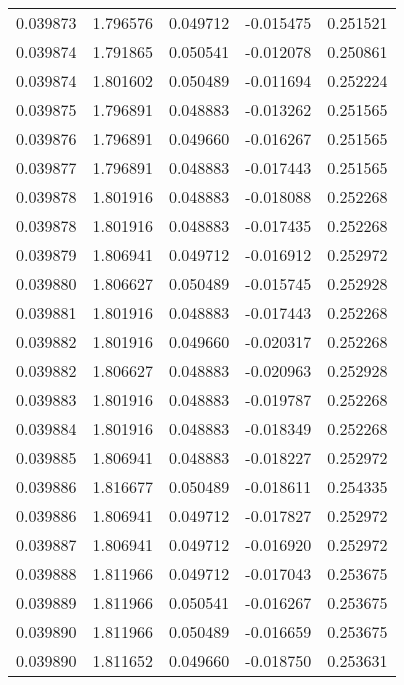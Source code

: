 \begin{tabular}{lrrrr}
0.039873    &  1.796576 &  0.049712 & -0.015475 &             0.251521 \\
0.039874    &  1.791865 &  0.050541 & -0.012078 &             0.250861 \\
0.039874    &  1.801602 &  0.050489 & -0.011694 &             0.252224 \\
0.039875    &  1.796891 &  0.048883 & -0.013262 &             0.251565 \\
0.039876    &  1.796891 &  0.049660 & -0.016267 &             0.251565 \\
0.039877    &  1.796891 &  0.048883 & -0.017443 &             0.251565 \\
0.039878    &  1.801916 &  0.048883 & -0.018088 &             0.252268 \\
0.039878    &  1.801916 &  0.048883 & -0.017435 &             0.252268 \\
0.039879    &  1.806941 &  0.049712 & -0.016912 &             0.252972 \\
0.039880    &  1.806627 &  0.050489 & -0.015745 &             0.252928 \\
0.039881    &  1.801916 &  0.048883 & -0.017443 &             0.252268 \\
0.039882    &  1.801916 &  0.049660 & -0.020317 &             0.252268 \\
0.039882    &  1.806627 &  0.048883 & -0.020963 &             0.252928 \\
0.039883    &  1.801916 &  0.048883 & -0.019787 &             0.252268 \\
0.039884    &  1.801916 &  0.048883 & -0.018349 &             0.252268 \\
0.039885    &  1.806941 &  0.048883 & -0.018227 &             0.252972 \\
0.039886    &  1.816677 &  0.050489 & -0.018611 &             0.254335 \\
0.039886    &  1.806941 &  0.049712 & -0.017827 &             0.252972 \\
0.039887    &  1.806941 &  0.049712 & -0.016920 &             0.252972 \\
0.039888    &  1.811966 &  0.049712 & -0.017043 &             0.253675 \\
0.039889    &  1.811966 &  0.050541 & -0.016267 &             0.253675 \\
0.039890    &  1.811966 &  0.050489 & -0.016659 &             0.253675 \\
0.039890    &  1.811652 &  0.049660 & -0.018750 &             0.253631 \\

\end{tabular}
